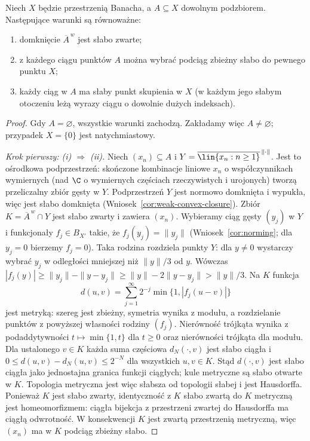 \begin{twierdzenie}
\label{thm:eberlein-smulian26}
Niech $X$ będzie przestrzenią Banacha, a $A\subseteq X$
dowolnym podzbiorem. Następujące warunki są równoważne:
\begin{enumerate}[label=\textup{(\roman*)}]
\item domknięcie $\overline A^{\,w}$ jest słabo zwarte;
\item z każdego ciągu punktów $A$ można wybrać podciąg
zbieżny słabo do pewnego punktu $X$;
\item każdy ciąg w $A$ ma słaby punkt skupienia w $X$
(w każdym jego słabym otoczeniu leżą wyrazy ciągu o dowolnie dużych indeksach).
\end{enumerate}
\end{twierdzenie}
\begin{proof}
Gdy $A=\varnothing$, wszystkie warunki zachodzą.
Zakładamy więc $A\ne\varnothing$; przypadek $X=\{0\}$
jest natychmiastowy.

\emph{Krok pierwszy: (i) $\Rightarrow$ (ii).}
Niech $(x_n)\subseteq A$ i
$Y=\overline{\lin\{x_n:n\ge1\}}^{\,\|\cdot\|}$.
Jest to ośrodkowa podprzestrzeń: skończone kombinacje
liniowe $x_n$ o współczynnikach wymiernych (nad $\C$
o wymiernych częściach rzeczywistych i urojonych)
tworzą przeliczalny zbiór gęsty w $Y$.
Podprzestrzeń $Y$ jest normowo domknięta i wypukła,
więc jest słabo domknięta
(Wniosek~\ref{cor:weak-convex-closure}). Zbiór
$K=\overline A^{\,w}\cap Y$ jest słabo zwarty i zawiera $(x_n)$.
Wybieramy ciąg gęsty $(y_j)$ w $Y$ i funkcjonały
$f_j\in B_{X'}$ takie, że $f_j(y_j)=\|y_j\|$
(Wniosek~\ref{cor:norming}; dla $y_j=0$ bierzemy $f_j=0$).
Taka rodzina rozdziela punkty $Y$: dla $y\ne0$ wystarczy
wybrać $y_j$ w odległości mniejszej niż $\|y\|/3$ od $y$.
Wówczas $|f_j(y)|\ge\|y_j\|-\|y-y_j\|
\ge\|y\|-2\|y-y_j\|>\|y\|/3$.
Na $K$ funkcja
\[
d(u,v)=\sum_{j=1}^\infty 2^{-j}\min\{1,|f_j(u-v)|\}
\]
jest metryką: szereg jest zbieżny, symetria wynika
z modułu, a rozdzielanie punktów z powyższej własności
rodziny $(f_j)$. Nierówność trójkąta wynika z
podaddytywności $t\mapsto\min\{1,t\}$ dla $t\ge0$
oraz nierówności trójkąta dla modułu.
Dla ustalonego $v\in K$ każda suma częściowa
$d_N(\cdot,v)$ jest słabo ciągła i
$0\le d(u,v)-d_N(u,v)\le2^{-N}$ dla wszystkich $u,v\in K$.
Stąd $d(\cdot,v)$ jest słabo ciągła jako jednostajna
granica funkcji ciągłych; kule metryczne są słabo
otwarte w $K$. Topologia metryczna jest więc słabsza
od topologii słabej i jest Hausdorffa. Ponieważ $K$ jest słabo zwarty,
identyczność z $K$ słabo zwartą do $K$ metryczną jest
homeomorfizmem: ciągła bijekcja z przestrzeni zwartej
do Hausdorffa ma ciągłą odwrotność. W konsekwencji $K$
jest zwartą przestrzenią metryczną, więc $(x_n)$ ma w $K$
podciąg zbieżny słabo.


\end{proof}
